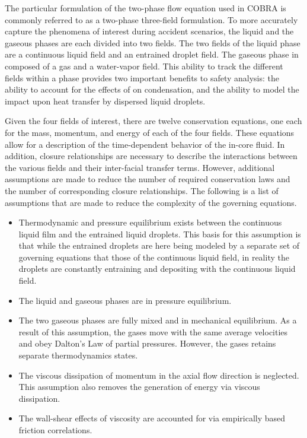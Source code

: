 The particular formulation of the two-phase flow equation used in COBRA is commonly referred to as a two-phase three-field formulation. 
To more accurately capture the phenomena of interest during accident scenarios, the liquid and the gaseous phases are each divided into two fields.
The two fields of the liquid phase are a continuous liquid field and an entrained droplet field.
The gaseous phase in composed of a \ncg gas and a water-vapor field. 
This ability to track the different fields within a phase provides two important benefits to safety analysis: the ability to account for the effects of \ncgs on condensation, and the ability to model the impact upon heat transfer by dispersed liquid droplets.

Given the four fields of interest, there are twelve conservation equations, one each for the mass, momentum, and energy of each of the four fields.
These equations allow for a description of the time-dependent behavior of the in-core fluid.
In addition, closure relationships are necessary to describe the interactions between the various fields and their inter-facial transfer terms.
However, additional assumptions are made to reduce the number of required conservation laws and the number of corresponding closure relationships.
The following is a list of assumptions that are made to reduce the complexity of the governing equations.

\begin{itemize}
\item{
Thermodynamic and pressure equilibrium exists between the continuous liquid film and the entrained liquid droplets.
This basis for this assumption is that while the entrained droplets are here being modeled by a separate set of governing equations that those of the continuous liquid field, in reality the droplets are constantly entraining and depositing with the continuous liquid field. 
}
\item{
The liquid and gaseous phases are in pressure equilibrium.
}
\item{
The two gaseous phases are fully mixed and in mechanical equilibrium.
As a result of this assumption, the gases move with the same average velocities and obey Dalton's Law of partial pressures.
However, the gases retains separate thermodynamics states.
}
\item{
The viscous dissipation of momentum in the axial flow direction is neglected.
This assumption also removes the generation of energy via viscous dissipation.
}
\item{
The wall-shear effects of viscosity are accounted for via empirically based friction correlations.
}
\end{itemize}

